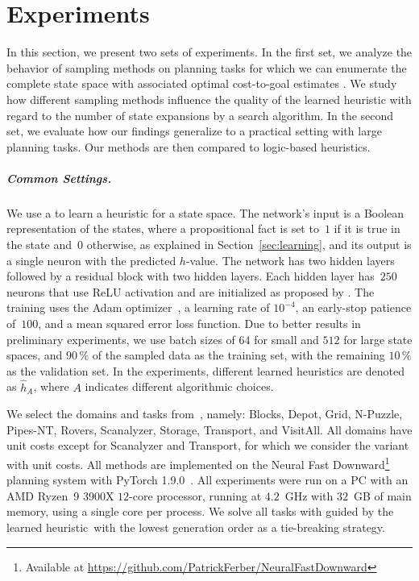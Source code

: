 \chapter{Experiments}
\label{sec:experiments}


In this section, we present two sets of experiments.  In the first set, we analyze the behavior of sampling methods on planning tasks for which we can enumerate the complete state space with associated optimal cost-to-goal estimates \hstar.  We study how different sampling methods influence the quality of the learned heuristic with regard to the number of state expansions by a search algorithm.  In the second set, we evaluate how our findings generalize to a practical setting with large planning tasks. Our methods are then compared to logic-based heuristics.

\paragraph{Common Settings.}
\label{sec:methodology}

We use a  \cite{He.etal/2016} to learn a heuristic for a state space. The network's input is a Boolean representation of the states, where a propositional fact is set to~$1$ if it is true in the state and~$0$ otherwise, as explained in Section~\ref{sec:learning}, and its output is a single neuron with the predicted $h$-value. The network has two hidden layers followed by a residual block with two hidden layers. Each hidden layer has~$250$ neurons that use ReLU activation and are initialized as proposed by \citeyear{He.etal/2015}. The training uses the Adam optimizer~\cite{Kingma.Ba/2015}, a learning rate of $10^{-4}$, an early-stop patience of~$100$, and a mean squared error loss function. Due to better results in preliminary experiments, we use batch sizes of $64$ for small and $512$ for large state spaces, and $90\,\%$ of the sampled data as the training set, with the remaining $10\,\%$ as the validation set. In the experiments, different learned heuristics are denoted as $\hat h_A$, where $A$ indicates different algorithmic choices.

We select the domains and tasks from~\citeyear{Ferber.etal/2022}, namely: Blocks, Depot, Grid, N-Puzzle, Pipes-NT, Rovers, Scanalyzer, Storage, Transport, and VisitAll. All domains have unit costs except for Scanalyzer and Transport, for which we consider the variant with unit costs. All methods are implemented on the Neural Fast Downward\footnote{Available at \url{https://github.com/PatrickFerber/NeuralFastDownward}} planning system with PyTorch 1.9.0~\cite{Ferber.etal/2020a,Paszke/2019}.
All experiments were run on a PC with an AMD Ryzen~9 3900X $12$-core processor, running at $4.2$~GHz with $32$~GB of main memory, using a single core per process. We solve all tasks with \gbfs guided by the learned heuristic~\hnn with the lowest generation order as a tie-breaking strategy.

